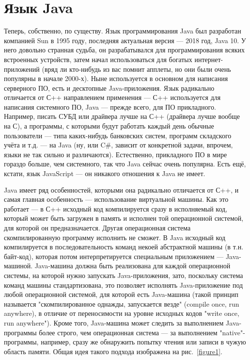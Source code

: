 \documentclass[a5paper]{article}
\begin{document}
\section{Язык Java}

Теперь, собственно, по существу. Язык программирования Java был разработан компанией Sun в 1995 году, последняя актуальная версия --- 2018 год, Java 10. У него довольно странная судьба, он разрабатывался для программирования всяких встроенных устройств, затем начал использоваться для богатых интернет-приложений (вряд ли кто-нибудь из вас помнит апплеты, но они были очень популярны в начале 2000-х). Ныне используется в основном для написания серверного ПО, есть и десктопные Java-приложения. Язык радикально отличается от С++ направлением применения --- С++ используется для написания системного ПО, Java --- прежде всего, для ПО прикладного. Например, писать СУБД или драйвера лучше на С++ (драйвера лучше вообще на С), а программы, с которыми будут работать каждый день обычные пользователи --- типа каких-нибудь банковских систем, программ складского учёта и т.д. --- на Java (ну, или C\#, зависит от конкретной задачи, впрочем, языки не так сильно и различаются). Естественно, прикладного ПО в мире гораздо больше, чем системного, так что Java сейчас очень популярна. Есть ещё, кстати, язык JavaScript --- он никакого отношения к Java не имеет.

Java имеет ряд особенностей, которыми она радикально отличается от С++, и самая главная особенность --- использование виртуальной машины. Как это работает --- в С++ исходный код компилируется сразу в исполняемый код, который может быть загружен в память и исполнен той операционной системой, для которой он предназначается. Другая операционная система скомпилированную программу исполнить не сможет. В Java исходный код компилируется в последовательность команд некоей абстрактной машины (в т.н. байт-код), которая потом интерпретируется специальным приложением --- Java-машиной. Java-машина должна быть реализована для каждой операционной системы, на которой нужно запускать Java-приложения, зато, поскольку система команд машины стандартизована, это позволяет исполнять Java-приложение под любой операционной системой, для которой есть Java-машина (такой принцип называется "скомпилированное однажды, запускается везде" (compile once, run anywhere), в отличие от переносимости на уровне исходных кодов "write once, run anywhere"). Кроме того, Java-машина может следить за выполнением Java-программы более строго, чем операционная система --- за выполнением "native"-программы, например, сразу же обнаружить попытку чтения или записи в чужую область памяти. Общая идея такого подхода изображена на рис.~\ref{figure1}.
\end{document}
